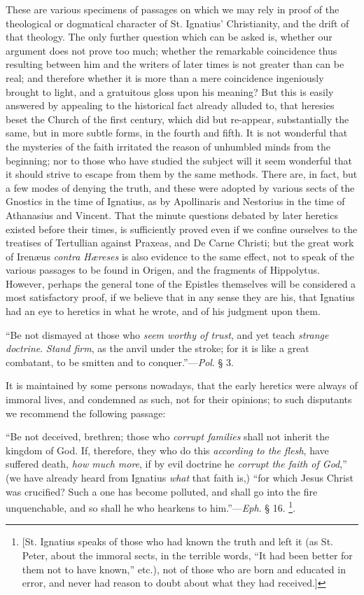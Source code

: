 These are various specimens of passages on which
we may rely in proof of the theological or dogmatical character of St.
Ignatius' Christianity, and the drift of that theology. The only
further question which can be asked is, whether our argument does not
prove too much; whether the remarkable coincidence thus resulting
between him and the writers of later times is not greater than can be
real; and therefore whether it is more than a mere coincidence
ingeniously brought to light, and a gratuitous gloss upon his meaning?
But this is easily answered by appealing to the historical fact
already alluded to, that heresies beset the Church of the first
century, which did but re-appear, substantially the same, but in more
subtle forms, in the fourth and fifth. It is not wonderful that the
mysteries of the faith irritated the reason of unhumbled minds from
the beginning; nor to those who have studied the subject will it
seem wonderful that it should strive to escape from them by the same
methods. There are, in fact, but a few modes of denying the truth, and
these were adopted by various sects of the Gnostics in the time of
Ignatius, as by Apollinaris and Nestorius in the time of Athanasius
and Vincent. That the minute questions debated by later heretics
existed before their times, is sufficiently proved even if we confine
ourselves to the treatises of Tertullian against Praxeas, and De Carne
Christi; but the great work of Irenæus \emph{contra Hæreses} is also
evidence to the same effect, not to speak of the various passages to
be found in Origen, and the fragments of Hippolytus. However, perhaps
the general tone of the Epistles themselves will be considered a most
satisfactory proof, if we believe that in any sense they are his, that
Ignatius had an eye to heretics in what he wrote, and of his judgment
upon them.

``Be
not dismayed at those who \emph{seem worthy of trust}, and yet teach \emph{strange
doctrine}. \emph{Stand firm}, as the anvil under the stroke; for it
is like a great combatant, to be smitten and to conquer.''—\emph{Pol}.
§ 3.

It is maintained by some persons nowadays, that
the early heretics were always of immoral lives, and condemned as
such, not for their opinions; to such disputants we recommend the
following passage:

``Be
not deceived, brethren; those who \emph{corrupt families} shall not
inherit the kingdom of God. If, therefore, they who do this \emph{according
to the flesh}, have suffered death, \emph{how much more}, if by
evil doctrine he \emph{corrupt the faith of God},'' (we have already
heard from Ignatius \emph{what} that faith is,) ``for which Jesus
Christ was crucified? Such a one has become polluted, and shall go
into the fire unquenchable, and so shall he who hearkens to him.''—\emph{Eph}.
§ 16. \footnote{[St. Ignatius speaks of those who had known the truth and left it (as
St. Peter, about the immoral sects, in the terrible words, ``It had
been better for them not to have known,'' etc.), not of those who are
born and educated in error, and never had reason to doubt about what
they had received.]}.

